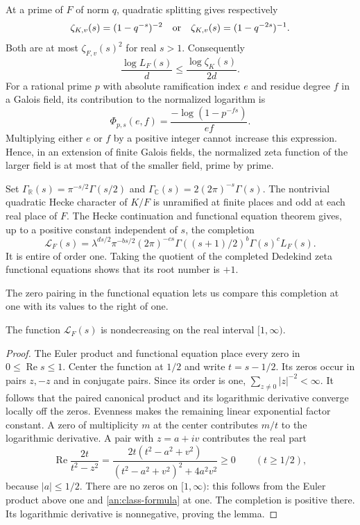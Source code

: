 At a prime of $F$ of norm $q$, quadratic splitting gives respectively
\[
 \zeta_{K,v}(s)=(1-q^{-s})^{-2}
 \quad\hbox{or}\quad
 \zeta_{K,v}(s)=(1-q^{-2s})^{-1}.
\]
Both are at most $\zeta_{F,v}(s)^2$ for real $s>1$. Consequently
\begin{equation}\label{an:relative-euler}
 \frac{\log L_F(s)}d
 \leq\frac{\log\zeta_K(s)}{2d}.
\end{equation}
For a rational prime $p$ with absolute ramification index $e$ and
residue degree $f$ in a Galois field, its contribution to the normalized
logarithm is
\begin{equation}\label{an:local-phi}
 \Phi_{p,s}(e,f)=\frac{-\log(1-p^{-fs})}{ef}.
\end{equation}
Multiplying either $e$ or $f$ by a positive integer cannot increase
this expression. Hence, in an extension of finite Galois fields, the
normalized zeta function of the larger field is at most that of the
smaller field, prime by prime.

Set $\Gamma_{\mathbb R}(s)=\pi^{-s/2}\Gamma(s/2)$ and
$\Gamma_{\mathbb C}(s)=2(2\pi)^{-s}\Gamma(s)$. The nontrivial
quadratic Hecke character of $K/F$ is unramified at finite places and
odd at each real place of $F$. The Hecke continuation and functional
equation theorem \cite{Hecke1920,Tate1967} gives, up to a
positive constant independent of $s$, the completion
\begin{equation}\label{an:completion}
 \mathcal L_F(s)=\lambda^{ds/2}\pi^{-bs/2}(2\pi)^{-cs}
       \Gamma((s+1)/2)^b\Gamma(s)^cL_F(s).
\end{equation}
It is entire of order one. Taking the quotient of the completed
Dedekind zeta functional equations shows that its root number is $+1$.

The zero pairing in the functional equation lets us compare this
completion at one with its values to the right of one.
\begin{lemma}\label{an:monotonicity}
The function $\mathcal L_F(s)$ is nondecreasing on the real interval
$[1,\infty)$.
\end{lemma}
\begin{proof}
The Euler product and functional equation place every zero in
$0\leq\operatorname{Re}s\leq1$. Center the function at $1/2$ and
write $t=s-1/2$. Its zeros occur in pairs $z,-z$ and in conjugate
pairs. Since its order is one, $\sum_{z\ne0}|z|^{-2}<\infty$.
It follows that the paired canonical product and its logarithmic
derivative converge locally off the zeros. Evenness makes the remaining linear exponential
factor constant. A zero of multiplicity $m$ at the center contributes
$m/t$ to the logarithmic derivative. A pair with $z=a+iv$ contributes
the real part
\[
 \operatorname{Re}\frac{2t}{t^2-z^2}
 =\frac{2t(t^2-a^2+v^2)}
 {(t^2-a^2+v^2)^2+4a^2v^2}\geq0\qquad(t\geq1/2),
\]
because $|a|\leq1/2$. There are no zeros on $[1,\infty)$:
this follows from the Euler product above one and
\eqref{an:class-formula} at one. The completion is positive there.
Its logarithmic derivative is nonnegative, proving the lemma.
\end{proof}

